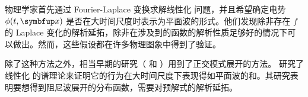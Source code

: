

物理学家首先通过 Fourier-Laplace 变换求解线性化 \eqvp 问题，并且希望确定电势 $\phi(t,\vx)$ 是否在大时间尺度时表示为平面波的形式。他们发现除非存在 $f$ 的 Laplace 变化的解析延拓，除非在涉及到的函数的解析性质足够好的情况下可以做出。然而，这些假设都在许多物理图象中得到了验证。



除了这种方法之外，相当早期的研究（\cite*{kampen_theory_1955} 和 \cite*{case_plasma_1959}）用到了正交模式展开的方法。\cite*{degond_spectral_1986} 研究了线性化 \eqvp 的谱理论来证明它的行为在大时间尺度下表现得如平面波的和。其研究表明要想得到阻尼波展开的分布函数，需要对\eqvp 预解式的解析延拓。



